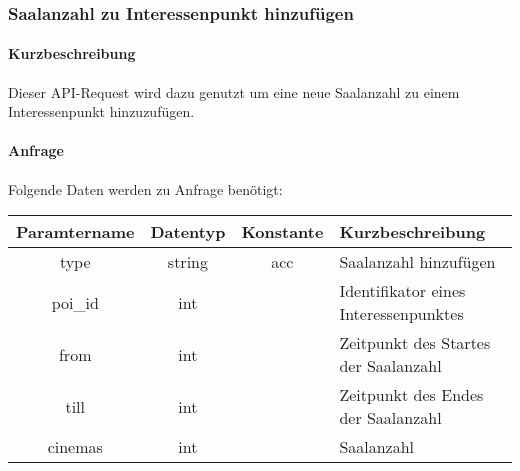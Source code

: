 \subsubsection{Saalanzahl zu Interessenpunkt hinzufügen}
\paragraph{Kurzbeschreibung}Dieser API-Request wird dazu genutzt um eine neue Saalanzahl zu einem Interessenpunkt hinzuzufügen.
\paragraph{Anfrage}Folgende Daten werden zu Anfrage benötigt:
\begin{table}[H]
	\begin{tabular}{|c|c|c|p{6.5cm}|}
		\hline
		\textbf{Paramtername} & \textbf{Datentyp} & \textbf{Konstante} & \textbf{Kurzbeschreibung}                                                                                               \\ \hline
		type                & string            & acc                & Saalanzahl hinzufügen \\ \hline
		poi\_id             & int               &                    & Identifikator eines Interessenpunktes \\ \hline
		from                & int               &                    & Zeitpunkt des Startes der Saalanzahl \\ \hline
		till                & int               &                    & Zeitpunkt des Endes der Saalanzahl \\ \hline
		cinemas             & int               &                    & Saalanzahl \\ \hline
	\end{tabular}
\end{table}
